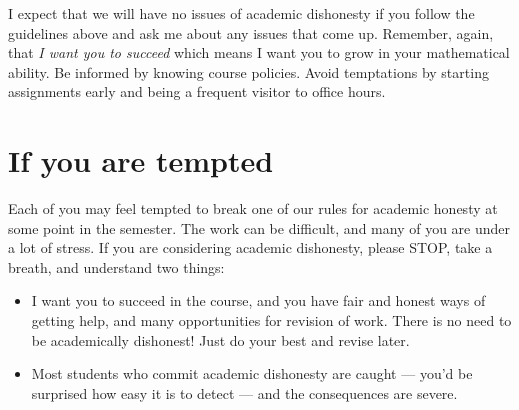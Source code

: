 \documentclass[12pt]{article}
\begin{document}
\noindent I expect that we will have no issues of academic dishonesty if you follow the guidelines above and ask me about any issues that come up.  Remember, again, that \emph{I want you to succeed} which means I want you to grow in your mathematical ability.  Be informed by knowing course policies. Avoid temptations by starting assignments early and being a frequent visitor to office hours.


\section*{If you are tempted}

Each of you may feel tempted to break one of our rules for academic honesty at some point in the semester. The work can be difficult, and many of you are under a lot of stress. If you are considering academic dishonesty, please STOP, take a breath, and understand two things: 
\begin{itemize}
\item I want you to succeed in the course, and you have fair and honest ways of getting help, and many opportunities for revision of work. There is no need to be academically dishonest! Just do your best and revise later.
\item Most students who commit academic dishonesty are caught --- you'd be surprised how easy it is to detect --- and the consequences are severe. 
\end{itemize}
\end{document}
